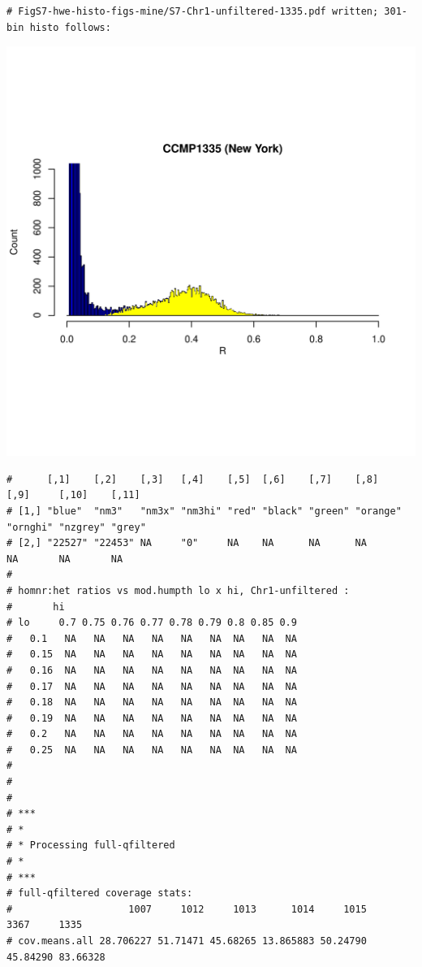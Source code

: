 \documentclass{article}\usepackage[]{graphicx}\usepackage[]{color}
\makeatletter
\def\maxwidth{ %
  \ifdim\Gin@nat@width>\linewidth
    \linewidth
  \else
    \Gin@nat@width
  \fi
}
\newenvironment{kframe}{%
 \def\at@end@of@kframe{}%
 \ifinner\ifhmode%
  \def\at@end@of@kframe{\end{minipage}}%
  \begin{minipage}{\columnwidth}%
 \fi\fi%
 \def\FrameCommand##1{\hskip\@totalleftmargin \hskip-\fboxsep
 \colorbox{shadecolor}{##1}\hskip-\fboxsep
     \hskip-\linewidth \hskip-\@totalleftmargin \hskip\columnwidth}%
 \MakeFramed {\advance\hsize-\width
   \@totalleftmargin\z@ \linewidth\hsize
   \@setminipage}}%
 {\par\unskip\endMakeFramed%
 \at@end@of@kframe}
\newenvironment{knitrout}{}{} %
\makeatother
\begin{document}
\begin{knitrout}
\begin{kframe}
\begin{verbatim}
# FigS7-hwe-histo-figs-mine/S7-Chr1-unfiltered-1335.pdf written; 301-bin histo follows:
\end{verbatim}
\end{kframe}
\includegraphics[width=\maxwidth]{FigS7-hwe-histo-figs-knitr/unnamed-chunk-10-27} 
\begin{kframe}\begin{verbatim}
#      [,1]    [,2]    [,3]   [,4]    [,5]  [,6]    [,7]    [,8]     [,9]     [,10]    [,11] 
# [1,] "blue"  "nm3"   "nm3x" "nm3hi" "red" "black" "green" "orange" "ornghi" "nzgrey" "grey"
# [2,] "22527" "22453" NA     "0"     NA    NA      NA      NA       NA       NA       NA
# 
# homnr:het ratios vs mod.humpth lo x hi, Chr1-unfiltered :
#       hi
# lo     0.7 0.75 0.76 0.77 0.78 0.79 0.8 0.85 0.9
#   0.1   NA   NA   NA   NA   NA   NA  NA   NA  NA
#   0.15  NA   NA   NA   NA   NA   NA  NA   NA  NA
#   0.16  NA   NA   NA   NA   NA   NA  NA   NA  NA
#   0.17  NA   NA   NA   NA   NA   NA  NA   NA  NA
#   0.18  NA   NA   NA   NA   NA   NA  NA   NA  NA
#   0.19  NA   NA   NA   NA   NA   NA  NA   NA  NA
#   0.2   NA   NA   NA   NA   NA   NA  NA   NA  NA
#   0.25  NA   NA   NA   NA   NA   NA  NA   NA  NA
# 
# 
# 
# ***
# *
# * Processing full-qfiltered 
# *
# ***
# full-qfiltered coverage stats:
#                    1007     1012     1013      1014     1015     3367     1335
# cov.means.all 28.706227 51.71471 45.68265 13.865883 50.24790 45.84290 83.66328

\end{verbatim}
\end{kframe}
\end{knitrout}
\end{document}
